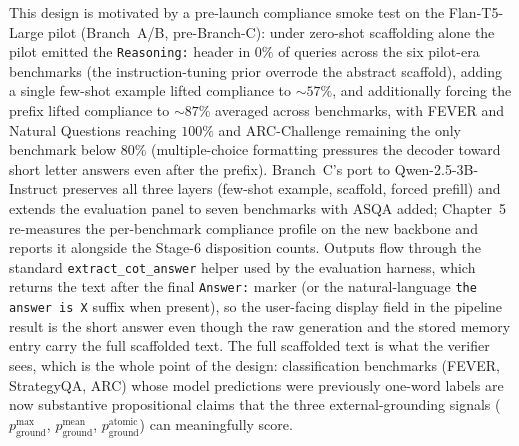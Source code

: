 This design is motivated by a pre-launch compliance smoke test on the Flan-T5-Large pilot (Branch~A/B, pre-Branch-C): under zero-shot scaffolding alone the pilot emitted the \texttt{Reasoning:} header in $0\%$ of queries across the six pilot-era benchmarks (the instruction-tuning prior overrode the abstract scaffold), adding a single few-shot example lifted compliance to $\sim\!57\%$, and additionally forcing the prefix lifted compliance to $\sim\!87\%$ averaged across benchmarks, with FEVER and Natural Questions reaching $100\%$ and ARC-Challenge remaining the only benchmark below $80\%$ (multiple-choice formatting pressures the decoder toward short letter answers even after the prefix). Branch~C's port to Qwen-2.5-3B-Instruct preserves all three layers (few-shot example, scaffold, forced prefill) and extends the evaluation panel to seven benchmarks with ASQA added; Chapter~5 re-measures the per-benchmark compliance profile on the new backbone and reports it alongside the Stage-6 disposition counts. Outputs flow through the standard \texttt{extract\_cot\_answer} helper used by the evaluation harness, which returns the text after the final \texttt{Answer:} marker (or the natural-language \texttt{the answer is X} suffix when present), so the user-facing display field in the pipeline result is the short answer even though the raw generation and the stored memory entry carry the full scaffolded text. The full scaffolded text is what the verifier sees, which is the whole point of the design: classification benchmarks (FEVER, StrategyQA, ARC) whose model predictions were previously one-word labels are now substantive propositional claims that the three external-grounding signals ($p_{\text{ground}}^{\text{max}}$, $p_{\text{ground}}^{\text{mean}}$, $p_{\text{ground}}^{\text{atomic}}$) can meaningfully score.

